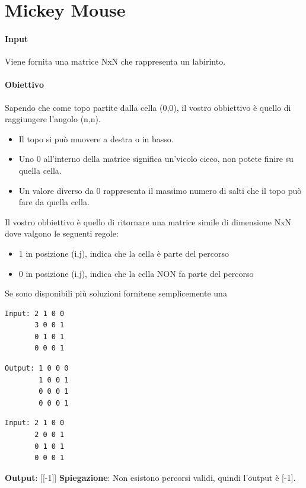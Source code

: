 \section*{Mickey Mouse}
    \paragraph{Input} Viene fornita una matrice NxN che rappresenta un labirinto.
    \paragraph{Obiettivo} Sapendo che come topo partite dalla cella (0,0), il vostro obbiettivo è quello di raggiungere l'angolo (n,n).
    \begin{itemize}
        \item Il topo si può muovere a destra o in basso.
        \item Uno 0 all'interno della matrice significa un'vicolo cieco, non potete finire su quella cella.
        \item Un valore diverso da 0 rappresenta il massimo numero di salti che il topo può fare da quella cella.
    \end{itemize}
    Il vostro obbiettivo è quello di ritornare una matrice simile di dimensione NxN dove valgono le seguenti regole:
    \begin{itemize}
        \item 1 in posizione (i,j), indica che la cella è parte del percorso
        \item 0 in posizione (i,j), indica che la cella NON fa parte del percorso
    \end{itemize}
    Se sono disponibili più soluzioni fornitene semplicemente una
    \begin{esempio}
        \begin{verbatim}
Input: 2 1 0 0
       3 0 0 1
       0 1 0 1
       0 0 0 1
        \end{verbatim}
        \begin{verbatim}
Output: 1 0 0 0
        1 0 0 1
        0 0 0 1
        0 0 0 1
        \end{verbatim}
    \end{esempio}
    \begin{esempio}
        \begin{verbatim}
Input: 2 1 0 0
       2 0 0 1
       0 1 0 1
       0 0 0 1
        \end{verbatim}
        \textbf{Output}: [[-1]]
        \newline
        \textbf{Spiegazione}: Non esistono percorsi validi, quindi l'output è [-1].
    \end{esempio}